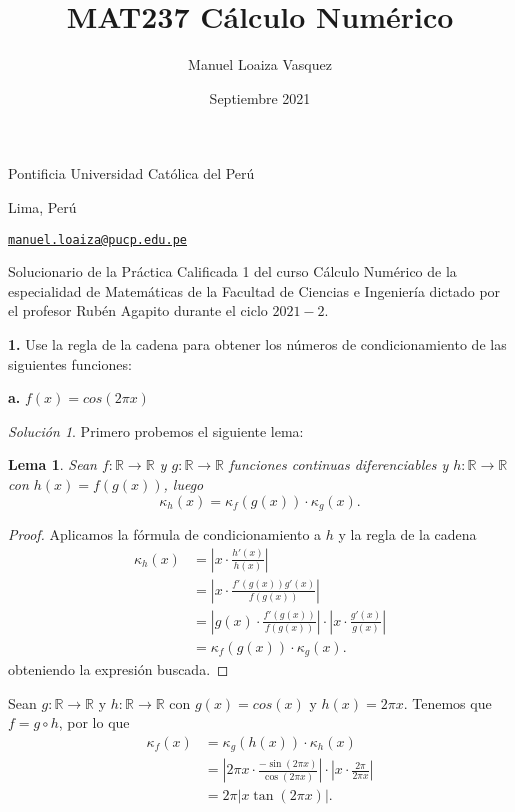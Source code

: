 \documentclass{article}
\title{MAT237 C\'alculo Num\'erico}
\author{Manuel Loaiza Vasquez}
\date{Septiembre 2021}
\newenvironment{statement}[1]{\smallskip\noindent\color[rgb]{1.00,0.00,0.50} {\bf #1.}}{}
\newtheorem{lemma}[theorem]{Lema}
\theoremstyle{definition}
\theoremstyle{remark}
\newtheorem*{solution}{Soluci\'on}
\newcommand{\BR}{\mathbb R}
\begin{document}
\maketitle

\vspace*{-0.25in}
\centerline{Pontificia Universidad Cat\'olica del Per\'u}
\centerline{Lima, Per\'u}
\centerline{\href{mailto:manuel.loaiza@pucp.edu.pe}{{\tt manuel.loaiza@pucp.edu.pe}}}
\vspace*{0.15in}

\begin{framed}
  Solucionario de la Pr\'actica Calificada 1 del curso C\'alculo Num\'erico
  de la especialidad de Matem\'aticas de la Facultad de Ciencias e Ingenier\'ia
  dictado por el profesor Rub\'en Agapito durante el ciclo $2021-2$.
\end{framed}

\begin{statement}{1}
  Use la regla de la cadena para obtener los n\'umeros de condicionamiento de
  las siguientes funciones:
\end{statement}

\begin{statement}{a}
  $f(x) = cos(2 \pi x)$
\end{statement}

\begin{solution}
  Primero probemos el siguiente lema:

  \begin{lemma}
    \label{lemma01}
    Sean $f:\BR \to \BR$ y $g:\BR \to \BR$ funciones continuas diferenciables y
    $h: \BR \to \BR$ con $h(x) = f(g(x))$, luego
    \[
      \kappa_h(x) = \kappa_f(g(x)) \cdot \kappa_g(x).
    \]
  \end{lemma}

  \begin{proof}
    Aplicamos la f\'ormula de condicionamiento a $h$ y la regla de la cadena
    \begin{align*}
      \kappa_h(x) &= \left|x \cdot \frac{h'(x)}{h(x)}\right|\\
      &= \left|x \cdot \frac{f'(g(x)) g'(x)}{f(g(x))}\right|\\
      &= \left|g(x) \cdot \frac{f'(g(x))}{f(g(x))}\right| \cdot \left|x \cdot \frac{g'(x)}{g(x)}\right|\\
      &= \kappa_f(g(x)) \cdot \kappa_g(x).
    \end{align*}
    obteniendo la expresi\'on buscada.
  \end{proof}

  Sean $g: \BR \to \BR$ y $h: \BR \to \BR$ con $g(x) = cos(x)$ y $h(x) = 2 \pi x$.
  Tenemos que $f = g \circ h$, por lo que
  \begin{align*}
    \kappa_f(x) &= \kappa_g(h(x)) \cdot \kappa_h(x)\\
    &= \left|2 \pi x \cdot \frac{-\sin(2 \pi x)}{\cos(2 \pi x)}\right| \cdot \left|x \cdot \frac{2 \pi}{2 \pi x}\right|\\
    &= 2\pi|x \tan(2 \pi x)|.
  \end{align*}
\end{solution}
\end{document}
